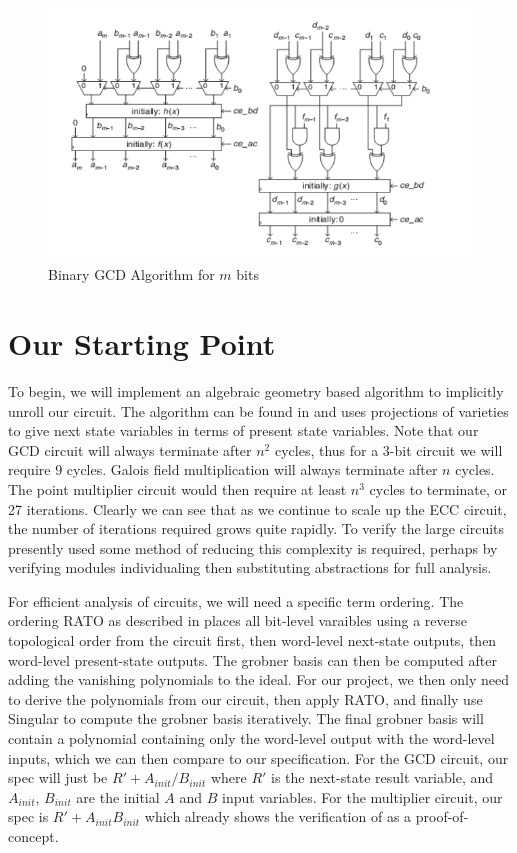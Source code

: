 \documentclass[12pt]{report}
\begin{document}
\begin{figure}
\includegraphics{images/gcd.png}
\caption{Binary GCD Algorithm for $m$ bits \cite{Ajay}}
\label{fig:gcd}
\end{figure}

\section{Our Starting Point}

To begin, we will implement an algebraic geometry based algorithm to implicitly unroll our circuit. The algorithm can be found in \cite{Kalla} and uses projections of varieties to give next state variables in terms of present state variables. Note that our GCD circuit will always terminate after $n^2$ cycles, thus for a 3-bit circuit we will require 9 cycles. Galois field multiplication will always terminate after $n$ cycles. The point multiplier circuit would then require at least $n^3$ cycles to terminate, or 27 iterations. Clearly we can see that as we continue to scale up the ECC circuit, the number of iterations required grows quite rapidly. To verify the large circuits presently used some method of reducing this complexity is required, perhaps by verifying modules individualing then substituting abstractions for full analysis. 

For efficient analysis of circuits, we will need a specific term ordering. The ordering RATO as described in \cite{Kalla} places all bit-level varaibles using a reverse topological order from the circuit first, then word-level next-state outputs, then word-level present-state outputs. The grobner basis can then be computed after adding the vanishing polynomials to the ideal. For our project, we then only need to derive the polynomials from our circuit, then apply RATO, and finally use Singular to compute the grobner basis iteratively. The final grobner basis will contain a polynomial containing only the word-level output with the word-level inputs, which we can then compare to our specification. For the GCD circuit, our spec will just be $R' + A_{init}/B_{init}$ where $R'$ is the next-state result variable, and $A_{init}$, $B_{init}$ are the initial $A$ and $B$ input variables. For the multiplier circuit, our spec is $R' + A_{init}B_{init}$ which \cite{Kalla} already shows the verification of as a proof-of-concept. 
\end{document}
